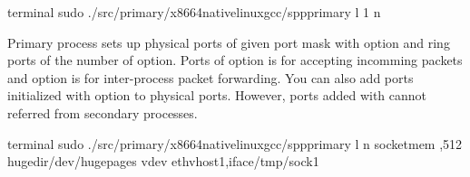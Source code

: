 \documentclass[a4paper,11pt,openany,oneside,english]{sphinxmanual}
\begin{document}
\begin{sphinxVerbatim}[commandchars=\\\{\},formatcom=\footnotesize]
 terminal 
 sudo ./src/primary/x86\PYGZus{}64\PYGZhy{}native\PYGZhy{}linux\PYGZhy{}gcc/spp\PYGZus{}primary 
    \PYGZhy{}l \PYGZhy{}1 \PYGZhy{}n    
\end{sphinxVerbatim}

Primary process sets up physical ports of given port mask with  option
and ring ports of the number of  option. Ports of   option is for
accepting incomming packets and  option is for inter-process packet
forwarding. You can also add ports initialized with  option to
physical ports. However, ports added with  cannot referred from
secondary processes.

\begin{sphinxVerbatim}[commandchars=\\\{\},formatcom=\footnotesize]
 terminal 
 sudo ./src/primary/x86\PYGZus{}64\PYGZhy{}native\PYGZhy{}linux\PYGZhy{}gcc/spp\PYGZus{}primary 
    \PYGZhy{}l  \PYGZhy{}n  
    \PYGZhy{}\PYGZhy{}socket\PYGZhy{}mem ,512 
    \PYGZhy{}\PYGZhy{}huge\PYGZhy{}dir/dev/hugepages 
    \PYGZhy{}\PYGZhy{}vdev eth\PYGZus{}vhost1,iface/tmp/sock1  
\end{sphinxVerbatim}
\end{document}
